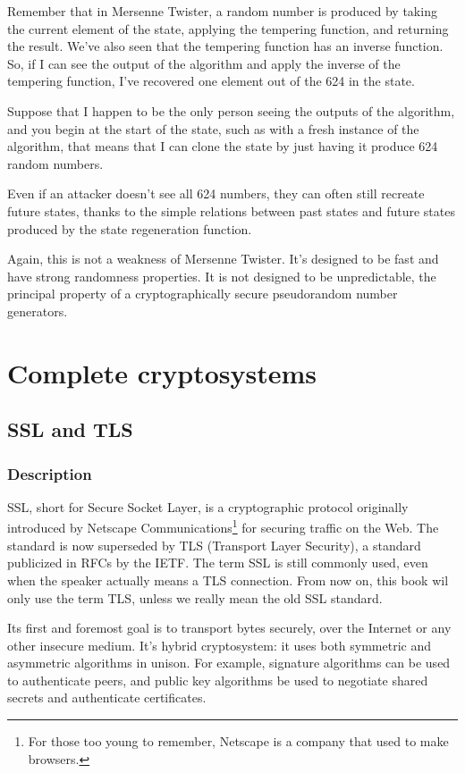 \documentclass[11pt,ebook,table,dvipsnames]{memoir}
\begin{document}
Remember that in Mersenne Twister, a random number is produced by
taking the current element of the state, applying the tempering
function, and returning the result. We've also seen that the tempering
function has an inverse function. So, if I can see the output of the
algorithm and apply the inverse of the tempering function, I've
recovered one element out of the 624 in the state.

Suppose that I happen to be the only person seeing the outputs of the
algorithm, and you begin at the start of the state, such as with a
fresh instance of the algorithm, that means that I can clone the state
by just having it produce 624 random numbers.

Even if an attacker doesn't see all 624 numbers, they can often still
recreate future states, thanks to the simple relations between past
states and future states produced by the state regeneration function.

Again, this is not a weakness of Mersenne Twister. It's designed to be
fast and have strong randomness properties. It is not designed to be
unpredictable, the principal property of a cryptographically secure
pseudorandom number generators.
\part{Complete cryptosystems}
\label{sec-3}
\chapter{SSL and TLS}
\label{sec-3-1}
\section{Description}
\label{sec-3-1-1}

SSL, short for Secure Socket Layer, is a cryptographic protocol
originally introduced by Netscape Communications\footnote{For those too
young to remember, Netscape is a company that used to make browsers.}
for securing traffic on the Web. The standard is now superseded by TLS
(Transport Layer Security), a standard publicized in RFCs by the IETF.
The term SSL is still commonly used, even when the speaker actually
means a TLS connection. From now on, this book wil only use the term
TLS, unless we really mean the old SSL standard.

Its first and foremost goal\cite{tls12} is to transport bytes
securely, over the Internet or any other insecure medium. It's hybrid
cryptosystem: it uses both symmetric and asymmetric algorithms in
unison. For example, signature algorithms can be used to authenticate
peers, and public key algorithms be used to negotiate shared secrets
and authenticate certificates.
\end{document}
